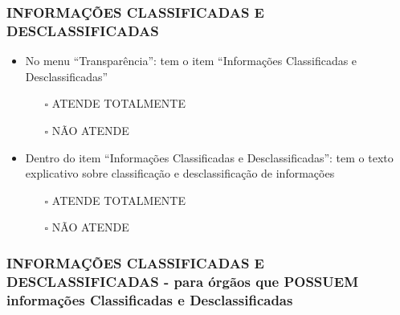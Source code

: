\documentclass[
]{book}
\providecommand{\tightlist}{%
  \setlength{\itemsep}{0pt}\setlength{\parskip}{0pt}}
\begin{document}
\hypertarget{informauxe7uxf5es-classificadas-e-desclassificadas-1}{%
\subsubsection*{INFORMAÇÕES CLASSIFICADAS E DESCLASSIFICADAS}\label{informauxe7uxf5es-classificadas-e-desclassificadas-1}}

\begin{itemize}
\tightlist
\item
  No menu ``Transparência'': tem o item ``Informações Classificadas e Desclassificadas''

  \begin{itemize}
  \tightlist
  \item[$\square$]
    ATENDE TOTALMENTE
  \item[$\square$]
    NÃO ATENDE
  \end{itemize}
\item
  Dentro do item ``Informações Classificadas e Desclassificadas'': tem o texto explicativo sobre classificação e desclassificação de informações

  \begin{itemize}
  \tightlist
  \item[$\square$]
    ATENDE TOTALMENTE
  \item[$\square$]
    NÃO ATENDE
  \end{itemize}
\end{itemize}

\hypertarget{informauxe7uxf5es-classificadas-e-desclassificadas---para-uxf3rguxe3os-que-possuem-informauxe7uxf5es-classificadas-e-desclassificadas}{%
\subsubsection*{INFORMAÇÕES CLASSIFICADAS E DESCLASSIFICADAS - para órgãos que POSSUEM informações Classificadas e Desclassificadas}\label{informauxe7uxf5es-classificadas-e-desclassificadas---para-uxf3rguxe3os-que-possuem-informauxe7uxf5es-classificadas-e-desclassificadas}}
\end{document}
